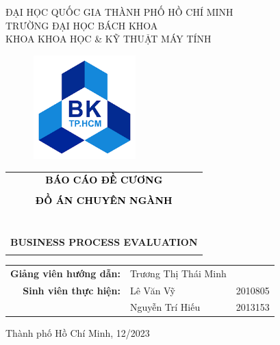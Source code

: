 \documentclass[a4paper]{article}
\begin{document}
\begin{titlepage}
	\begin{center}
		ĐẠI HỌC QUỐC GIA THÀNH PHỐ HỒ CHÍ MINH \\
		TRƯỜNG ĐẠI HỌC BÁCH KHOA \\
		KHOA KHOA HỌC \& KỸ THUẬT MÁY TÍNH
	\end{center}
	\renewcommand{\rmdefault}{ppl}
	\vspace{1cm}
	\begin{figure}[h!]
		\begin{center}
			\includegraphics[width=4cm, height=4cm]{Pictures/logoBK.png}
		\end{center}
	\end{figure}
	\vspace{1cm}

	\begin{center}
		\begin{tabular}{c}
			\textbf{\large\textcolor{black}{BÁO CÁO ĐỀ CƯƠNG}}       \\\\
			\textbf{\large\textcolor{black}{ĐỒ ÁN CHUYÊN NGÀNH}}     \\\\
			~~                                                       \\
			\hline
			\\
			\textbf{\LARGE \color{black}BUSINESS PROCESS EVALUATION} \\
			\\
			\hline
		\end{tabular}
	\end{center}
	\vspace{2cm}

	\begin{table}[H]
		\centering
		\begin{tabular}{rll}
			\textbf{Giảng viên hướng dẫn:} & Trương Thị Thái Minh &         \\
			\textbf{Sinh viên thực hiện:}  & Lê Văn Vỹ            & 2010805 \\
			                               & Nguyễn Trí Hiếu      & 2013153 \\
		\end{tabular}
	\end{table}

	\vspace{5cm}
	\begin{center}
		{\footnotesize Thành phố Hồ Chí Minh, 12/2023}
	\end{center}
\end{titlepage}
\vspace{20cm}
\end{document}
